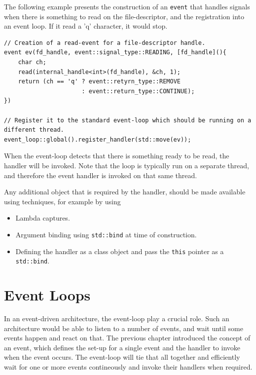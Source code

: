 \documentclass[10pt,a4paper,openany]{mudbook}
\begin{document}
The following example presents the construction of an \texttt{event} that
handles signals when there is something to read on the file-descriptor, and the
registration into an event loop. If it read a 'q' character, it would stop.

\begin{lstlisting}[style=snippet]
// Creation of a read-event for a file-descriptor handle.
event ev(fd_handle, event::signal_type::READING, [fd_handle](){
    char ch;
    read(internal_handle<int>(fd_handle), &ch, 1);
    return (ch == 'q' ? event::retyrn_type::REMOVE
                      : event::return_type::CONTINUE);
})

// Register it to the standard event-loop which should be running on a different thread.
event_loop::global().register_handler(std::move(ev));
\end{lstlisting}

When the event-loop detects that there is something ready to be read, the
handler will be invoked. Note that the loop is typically run on a separate
thread, and therefore the event handler is invoked on that same thread.

Any additional object that is required by the handler, should be made available
using techniques, for example by using
\begin{itemize}
  \item Lambda captures.
  \item Argument binding using \texttt{std::bind} at time of construction.
  \item Defining the handler as a class object and pass the \texttt{this} pointer
        as a \texttt{std::bind}.
\end{itemize}


\chapter{Event Loops}
\label{cpt:event-loops}

In an event-driven architecture, the event-loop play a crucial role. Such an
architecture would be able to listen to a number of events, and wait until
some events happen and react on that. The previous chapter introduced the
concept of an event, which defines the set-up for a single event and the
handler to invoke when the event occurs. The event-loop will tie that all
together and efficiently wait for one or more events contineously and invoke
their handlers when required.
\end{document}
